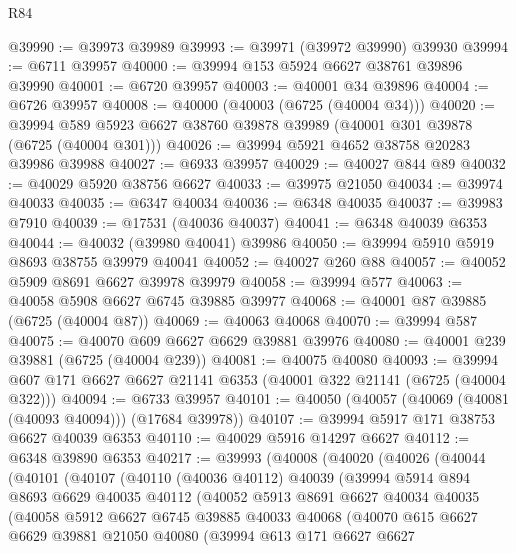 \begin{lexlean}{R84}
\begin{coremodule}
@39990 := @39973 @39989
@39993 := @39971 (@39972 @39990) @39930
@39994 := @6711 @39957
@40000 := @39994 @153 @5924 @6627 @38761 @39896 @39990
@40001 := @6720 @39957
@40003 := @40001 @34 @39896
@40004 := @6726 @39957
@40008 := @40000 (@40003 (@6725 (@40004 @34)))
@40020 := @39994 @589 @5923 @6627 @38760 @39878 @39989 (@40001 @301 @39878 (@6725 (@40004 @301)))
@40026 := @39994 @5921 @4652 @38758 @20283 @39986 @39988
@40027 := @6933 @39957
@40029 := @40027 @844 @89
@40032 := @40029 @5920 @38756 @6627
@40033 := @39975 @21050
@40034 := @39974 @40033
@40035 := @6347 @40034
@40036 := @6348 @40035
@40037 := @39983 @7910
@40039 := @17531 (@40036 @40037)
@40041 := @6348 @40039 @6353
@40044 := @40032 (@39980 @40041) @39986
@40050 := @39994 @5910 @5919 @8693 @38755 @39979 @40041
@40052 := @40027 @260 @88
@40057 := @40052 @5909 @8691 @6627 @39978 @39979
@40058 := @39994 @577
@40063 := @40058 @5908 @6627 @6745 @39885 @39977
@40068 := @40001 @87 @39885 (@6725 (@40004 @87))
@40069 := @40063 @40068
@40070 := @39994 @587
@40075 := @40070 @609 @6627 @6629 @39881 @39976
@40080 := @40001 @239 @39881 (@6725 (@40004 @239))
@40081 := @40075 @40080
@40093 := @39994 @607 @171 @6627 @6627 @21141 @6353 (@40001 @322 @21141 (@6725 (@40004 @322)))
@40094 := @6733 @39957
@40101 := @40050 (@40057 (@40069 (@40081 (@40093 @40094))) (@17684 @39978))
@40107 := @39994 @5917 @171 @38753 @6627 @40039 @6353
@40110 := @40029 @5916 @14297 @6627
@40112 := @6348 @39890 @6353
@40217 := @39993
    (@40008
      (@40020
        (@40026
          (@40044
            (@40101
              (@40107
                (@40110
                  (@40036 @40112)
                  @40039
                  (@39994
                    @5914
                    @894
                    @8693
                    @6629
                    @40035
                    @40112
                    (@40052
                      @5913
                      @8691
                      @6627
                      @40034
                      @40035
                      (@40058
                        @5912
                        @6627
                        @6745
                        @39885
                        @40033
                        @40068
                        (@40070
                          @615
                          @6627
                          @6629
                          @39881
                          @21050
                          @40080
                          (@39994
                            @613
                            @171
                            @6627
                            @6627

\end{coremodule}
\end{lexlean}
